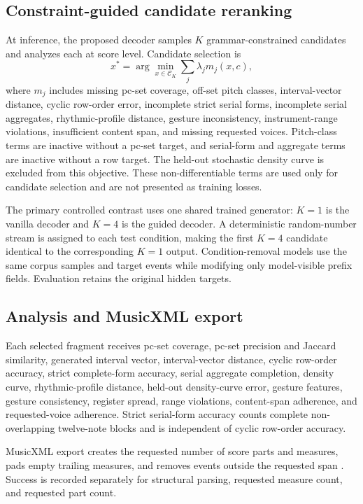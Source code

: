 \subsection{Constraint-guided candidate reranking}

At inference, the proposed decoder samples $K$ grammar-constrained candidates and analyzes each at score level. Candidate selection is
\begin{equation}
  x^*=\arg\min_{x\in\mathcal{C}_K}\sum_j\lambda_j m_j(x,c),
  \label{eq:reranking}
\end{equation}
where $m_j$ includes missing pc-set coverage, off-set pitch classes, interval-vector distance, cyclic row-order error, incomplete strict serial forms, incomplete serial aggregates, rhythmic-profile distance, gesture inconsistency, instrument-range violations, insufficient content span, and missing requested voices. Pitch-class terms are inactive without a pc-set target, and serial-form and aggregate terms are inactive without a row target. The held-out stochastic density curve is excluded from this objective. These non-differentiable terms are used only for candidate selection and are not presented as training losses.

The primary controlled contrast uses one shared trained generator: $K=1$ is the vanilla decoder and $K=4$ is the guided decoder. A deterministic random-number stream is assigned to each test condition, making the first $K=4$ candidate identical to the corresponding $K=1$ output. Condition-removal models use the same corpus samples and target events while modifying only model-visible prefix fields. Evaluation retains the original hidden targets.

\subsection{Analysis and MusicXML export}

Each selected fragment receives pc-set coverage, pc-set precision and Jaccard similarity, generated interval vector, interval-vector distance, cyclic row-order accuracy, strict complete-form accuracy, serial aggregate completion, density curve, rhythmic-profile distance, held-out density-curve error, gesture features, gesture consistency, register spread, range violations, content-span adherence, and requested-voice adherence. Strict serial-form accuracy counts complete non-overlapping twelve-note blocks and is independent of cyclic row-order accuracy.

MusicXML export creates the requested number of score parts and measures, pads empty trailing measures, and removes events outside the requested span \citep{musicxml2021spec}. Success is recorded separately for structural parsing, requested measure count, and requested part count.
